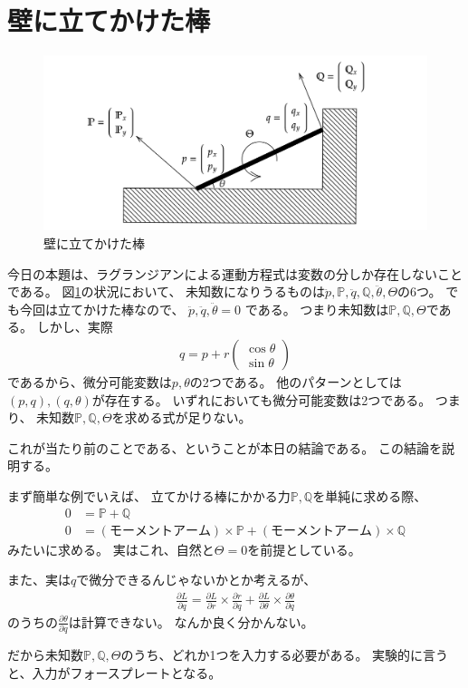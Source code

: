 \documentclass[a4paper,11pt]{jsarticle}
\begin{document}
\section{壁に立てかけた棒}
\begin{figure}[h]
  \centering
  \includegraphics[width = 1\textwidth]{wall_And_Stick.png}
  \caption{壁に立てかけた棒}
  \label{fig:wall_And_Stick}
\end{figure}
今日の本題は、ラグランジアンによる運動方程式は変数の分しか存在しないことである。
図\ref{fig:wall_And_Stick}の状況において、
未知数になりうるものは$\ddot{p},\mathbb{P},\ddot{q},\mathbb{Q},\ddot{\theta},\Theta$の6つ。
でも今回は立てかけた棒なので、
$\ddot{p},\ddot{q},\ddot{\theta} = 0$
である。
つまり未知数は$\mathbb{P},\mathbb{Q},\Theta$である。
しかし、実際
\begin{align*}
  q = p + r\begin{pmatrix}
    \cos\theta \\
    \sin\theta
  \end{pmatrix}
\end{align*}
であるから、微分可能変数は$p,\theta$の2つである。
他のパターンとしては$(p,q), (q,\theta)$が存在する。
いずれにおいても微分可能変数は2つである。
つまり、
未知数$\mathbb{P},\mathbb{Q},\Theta$を求める式が足りない。

これが当たり前のことである、ということが本日の結論である。
この結論を説明する。

まず簡単な例でいえば、
立てかける棒にかかる力$\mathbb{P},\mathbb{Q}$を単純に求める際、
\begin{align*}
  0 &= \mathbb{P} + \mathbb{Q} \\
  0 &= (モーメントアーム)\times\mathbb{P}  + (モーメントアーム)\times\mathbb{Q}
\end{align*}
みたいに求める。
実はこれ、自然と$\Theta = 0$を前提としている。

また、実は$q$で微分できるんじゃないかとか考えるが、
\begin{align*}
  \frac{\partial L}{\partial q} = \frac{\partial L}{\partial r}\times \frac{\partial r}{\partial q}
   + \frac{\partial L}{\partial \theta}\times \frac{\partial \theta}{\partial q}
\end{align*}
のうちの$\displaystyle \frac{\partial \theta}{\partial q}$は計算できない。
なんか良く分かんない。

だから未知数$\mathbb{P},\mathbb{Q},\Theta$のうち、どれか1つを入力する必要がある。
実験的に言うと、入力がフォースプレートとなる。
\end{document}
